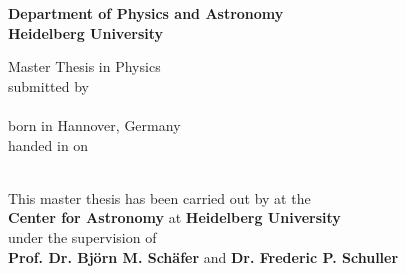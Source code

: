 \begin{titlepage}
\begin{center}
\makeatletter

\Large\textbf{Department of Physics and Astronomy\\
Heidelberg University}

\vfill

\normalsize
Master Thesis in Physics\\
\normalsize
submitted by\\[0.5cm]
\Large
\textbf{\@author}\\
\normalsize
born in Hannover, Germany\\[0.5cm]
\normalsize
handed in on\\
\Large
\textbf{\@date}\\[0.5cm]
\normalsize


\cleardoublepage
\thispagestyle{empty}


\LARGE\textbf{\@title}

\vfill

\normalsize
This master thesis has been carried out by \@author{} at the\\
\textbf{Center for Astronomy} at \textbf{Heidelberg University}\\
under the supervision of\\
\textbf{Prof. Dr. Björn M. Schäfer} and \textbf{Dr. Frederic P. Schuller}

\makeatother
\end{center}
\end{titlepage}
